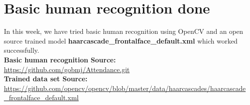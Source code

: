 \documentclass[12pt]{book}
\begin{document}
	\section{Basic human recognition done}
	In this week, we have tried basic human recognition using OpenCV and an open source trained model \textbf{haarcascade\_frontalface\_default.xml} which worked successfully. \\[12pt]
	\normalsize
	\textbf{Basic human recognition Source:} \\
	\url{https://github.com/gobmj/Attendance.git}
	\\[6pt]
	\textbf{Trained data set Source:} \\ \url{https://github.com/opencv/opencv/blob/master/data/haarcascades/haarcascade\_frontalface\_default.xml}
   
    
\end{document}
